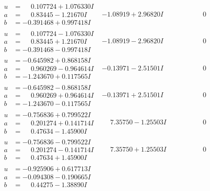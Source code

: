\documentclass[1p]{elsarticle_modified}
\theoremstyle{definition}
\begin{document}
$$\begin{array}{c|c|c}
\begin{aligned}
u &= \phantom{-}0.107724 + 1.076330 I \\
a &= \phantom{-}0.83445 - 1.21670 I \\
b &= -0.391468 + 0.997418 I\end{aligned}
 & -1.08919 + 2.96820 I & \phantom{-0.000000 } 0 \\ \hline\begin{aligned}
u &= \phantom{-}0.107724 - 1.076330 I \\
a &= \phantom{-}0.83445 + 1.21670 I \\
b &= -0.391468 - 0.997418 I\end{aligned}
 & -1.08919 - 2.96820 I & \phantom{-0.000000 } 0 \\ \hline\begin{aligned}
u &= -0.645982 + 0.868158 I \\
a &= \phantom{-}0.960269 - 0.964614 I \\
b &= -1.243670 + 0.117565 I\end{aligned}
 & -0.13971 - 2.51501 I & \phantom{-0.000000 } 0 \\ \hline\begin{aligned}
u &= -0.645982 - 0.868158 I \\
a &= \phantom{-}0.960269 + 0.964614 I \\
b &= -1.243670 - 0.117565 I\end{aligned}
 & -0.13971 + 2.51501 I & \phantom{-0.000000 } 0 \\ \hline\begin{aligned}
u &= -0.756836 + 0.799522 I \\
a &= \phantom{-}0.201274 + 0.141714 I \\
b &= \phantom{-}0.47634 - 1.45900 I\end{aligned}
 & \phantom{-}7.35750 - 1.25503 I & \phantom{-0.000000 } 0 \\ \hline\begin{aligned}
u &= -0.756836 - 0.799522 I \\
a &= \phantom{-}0.201274 - 0.141714 I \\
b &= \phantom{-}0.47634 + 1.45900 I\end{aligned}
 & \phantom{-}7.35750 + 1.25503 I & \phantom{-0.000000 } 0 \\ \hline\begin{aligned}
u &= -0.925906 + 0.617713 I \\
a &= -0.094308 - 0.190665 I \\
b &= \phantom{-}0.44275 - 1.38890 I\end{aligned}

\end{array}$$
\end{document}

